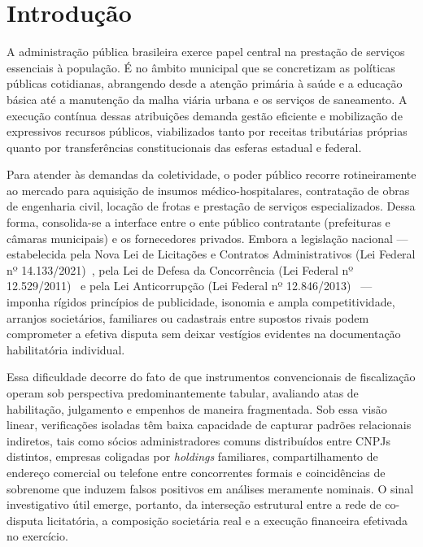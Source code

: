 \section{Introdução}
\label{sec:introducao}

A administração pública brasileira exerce papel central na prestação de serviços essenciais à população. É no âmbito municipal que se concretizam as políticas públicas cotidianas, abrangendo desde a atenção primária à saúde e a educação básica até a manutenção da malha viária urbana e os serviços de saneamento. A execução contínua dessas atribuições demanda gestão eficiente e mobilização de expressivos recursos públicos, viabilizados tanto por receitas tributárias próprias quanto por transferências constitucionais das esferas estadual e federal.

Para atender às demandas da coletividade, o poder público recorre rotineiramente ao mercado para aquisição de insumos médico-hospitalares, contratação de obras de engenharia civil, locação de frotas e prestação de serviços especializados. Dessa forma, consolida-se a interface entre o ente público contratante (prefeituras e câmaras municipais) e os fornecedores privados. Embora a legislação nacional — estabelecida pela Nova Lei de Licitações e Contratos Administrativos (Lei Federal nº 14.133/2021)~\cite{brasil2021licitacoes}, pela Lei de Defesa da Concorrência (Lei Federal nº 12.529/2011)~\cite{brasil2011concorrencia} e pela Lei Anticorrupção (Lei Federal nº 12.846/2013)~\cite{brasil2013anticorrupcao} — imponha rígidos princípios de publicidade, isonomia e ampla competitividade, arranjos societários, familiares ou cadastrais entre supostos rivais podem comprometer a efetiva disputa sem deixar vestígios evidentes na documentação habilitatória individual.

Essa dificuldade decorre do fato de que instrumentos convencionais de fiscalização operam sob perspectiva predominantemente tabular, avaliando atas de habilitação, julgamento e empenhos de maneira fragmentada. Sob essa visão linear, verificações isoladas têm baixa capacidade de capturar padrões relacionais indiretos, tais como sócios administradores comuns distribuídos entre CNPJs distintos, empresas coligadas por \textit{holdings} familiares, compartilhamento de endereço comercial ou telefone entre concorrentes formais e coincidências de sobrenome que induzem falsos positivos em análises meramente nominais. O sinal investigativo útil emerge, portanto, da interseção estrutural entre a rede de co-disputa licitatória, a composição societária real e a execução financeira efetivada no exercício.

